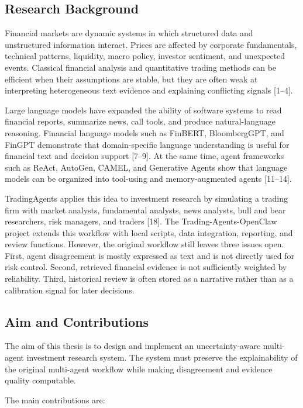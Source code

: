 \documentclass[14pt,a4paper]{extarticle}
\begin{document}
\subsection{Research Background}

Financial markets are dynamic systems in which structured data and unstructured information interact. Prices are affected by corporate fundamentals, technical patterns, liquidity, macro policy, investor sentiment, and unexpected events. Classical financial analysis and quantitative trading methods can be efficient when their assumptions are stable, but they are often weak at interpreting heterogeneous text evidence and explaining conflicting signals [1--4].

Large language models have expanded the ability of software systems to read financial reports, summarize news, call tools, and produce natural-language reasoning. Financial language models such as FinBERT, BloombergGPT, and FinGPT demonstrate that domain-specific language understanding is useful for financial text and decision support [7--9]. At the same time, agent frameworks such as ReAct, AutoGen, CAMEL, and Generative Agents show that language models can be organized into tool-using and memory-augmented agents [11--14].

TradingAgents applies this idea to investment research by simulating a trading firm with market analysts, fundamental analysts, news analysts, bull and bear researchers, risk managers, and traders [18]. The Trading-Agents-OpenClaw project extends this workflow with local scripts, data integration, reporting, and review functions. However, the original workflow still leaves three issues open. First, agent disagreement is mostly expressed as text and is not directly used for risk control. Second, retrieved financial evidence is not sufficiently weighted by reliability. Third, historical review is often stored as a narrative rather than as a calibration signal for later decisions.

\subsection{Aim and Contributions}

The aim of this thesis is to design and implement an uncertainty-aware multi-agent investment research system. The system must preserve the explainability of the original multi-agent workflow while making disagreement and evidence quality computable.

The main contributions are:
\end{document}
